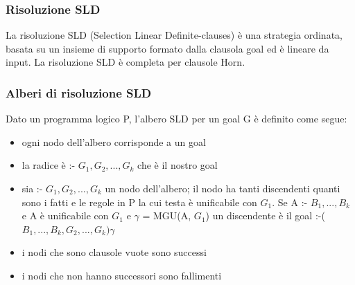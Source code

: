 \documentclass{article}
\begin{document}
\subsubsection{Risoluzione SLD}
La risoluzione SLD (Selection Linear Definite-clauses) è una strategia ordinata, basata su un insieme di supporto formato dalla clausola goal ed è lineare da input. La risoluzione SLD è completa per clausole Horn.

\subsubsection{Alberi di risoluzione SLD}
Dato un programma logico P, l’albero SLD per un goal G è definito come segue:
\begin{itemize}
    \item ogni nodo dell’albero corrisponde a un goal
    \item la radice è :- $G_1, G_2, ..., G_k$ che è il nostro goal
    \item sia :- $G_1, G_2, ..., G_k$ un nodo dell'albero; il nodo ha tanti discendenti quanti sono i fatti e le regole in P la cui testa è unificabile con $G_1$. \newline 
    Se A :- $B_1, ..., B_k$ e A è unificabile con $G_1$ e $\gamma$ = MGU(A, $G_1$) un discendente è il goal :-($B_1, ..., B_k, G_2, ..., G_k) \gamma$
    \item i nodi che sono clausole vuote sono successi
    \item i nodi che non hanno successori sono fallimenti
\end{itemize}
\end{document}
